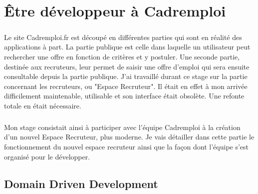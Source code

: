 
\chapter{Être développeur à Cadremploi} %

\label{apports} %


\paragraph{}
Le site Cadremploi.fr est découpé en différentes parties qui sont en réalité des applications à part.
La partie publique est celle dans laquelle un utilisateur peut rechercher une offre en fonction de critères et y postuler.
Une seconde partie, destinée aux recruteurs, leur permet de saisir une offre d'emploi qui sera ensuite consultable depuis la partie publique.
J'ai travaillé durant ce stage sur la partie concernant les recruteurs, ou "Espace Recruteur".
Il était en effet à mon arrivée difficilement maintenable, utilisable et son interface était obsolète.
Une refonte totale en était nécessaire.
\paragraph{}
Mon stage consistait ainsi à participer avec l'équipe Cadremploi à la création d'un nouvel Espace Recruteur, plus moderne.
Je vais détailler dans cette partie le fonctionnement du nouvel espace recruteur ainsi que la façon dont l'équipe s'est organisé pour le développer.









\section{Domain Driven Development}


